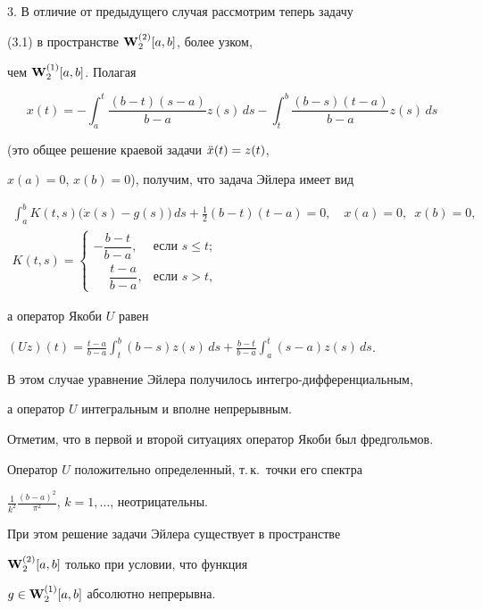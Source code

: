 \begin{exam}
3. В отличие от предыдущего случая рассмотрим теперь задачу


(3.1) в пространстве $\bold W{}_2^{(2)}[a,b]$, более узком,


чем $\bold W{}_2^{(1)}[a,b]$. Полагая


$$


x(t)=-\int_a^t\frac{(b-t)(s-a)}{b-a}z(s)\,ds-


\int_t^b\frac{(b-s)(t-a)}{b-a}z(s)\,ds


$$


(это общее решение краевой задачи $\Ddot x(t)=z(t)$,


$x(a)=0$, $x(b)=0$), получим, что задача Эйлера имеет вид


\begin{gather*}


\int_a^bK(t,s)\big(\Dot x(s)-g(s)\big)\,ds+


\frac{1}{2}(b-t)(t-a)=0,\quad


x(a)=0,\ \;x(b)=0, \\


%


K(t,s)=


\begin{cases}


-\dfrac{b-t}{b-a},&\text{если }s\le t;\\[3mm]


\phantom{-}\dfrac{t-a}{b-a},&\text{если }s>t,


\end{cases}


\end{gather*}


а оператор Якоби $U$ равен


$(Uz)(t)=\frac{t-a}{b-a}\int_t^b(b-s)z(s)\,ds+\frac{b-t}{b-a}


\int_a^t(s-a)z(s)\,ds$.


В этом случае уравнение Эйлера получилось интегро-дифференциальным,


а оператор $U$ интегральным и вполне непрерывным.





Отметим, что в первой и второй ситуациях оператор Якоби был фредгольмов.


Оператор $U$ положительно определенный, т.\,к.~точки его спектра


$\frac{1}{k^2}\frac{(b-a)^2}{\pi^2}$, $k=1,\dotsc$, неотрицательны.


При этом решение задачи Эйлера существует в пространстве


$\bold W{}_2^{(2)}[a,b]$ только при условии, что функция


$g\in\bold W{}_2^{(1)}[a,b]$ абсолютно непрерывна.


\end{exam}






